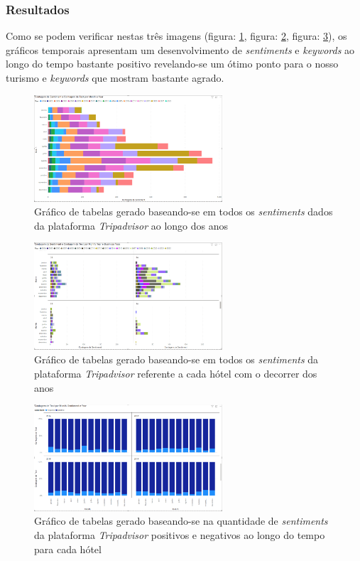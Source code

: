 \subsubsection{Resultados}

Como se podem verificar nestas três imagens (figura: \ref{fig:exemplofigqntsntmyear},  figura: \ref{fig:exemplofigqntyearbus}, figura: \ref{fig:exemplofigposneg}), os gráficos temporais apresentam um desenvolvimento de \textit{sentiments} e \textit{keywords} ao longo do tempo bastante positivo revelando-se um ótimo ponto para o nosso turismo e \textit{keywords} que mostram bastante agrado. 

\begin{figure}[!htb]
\centering
\includegraphics[width=7cm]{figuras/NrReviewsPerYear/TableGraph6.PNG}
\caption{Gráfico de tabelas gerado baseando-se em todos os \textit{sentiments} dados da plataforma \textit{Tripadvisor} ao longo dos anos}
\label{fig:exemplofigqntsntmyear}
\end{figure}

\begin{figure}[!htb]
\centering
\includegraphics[width=7cm]{figuras/NrReviewsPerYear&BusinessType/8.PNG}
\caption{Gráfico de tabelas gerado baseando-se em todos os \textit{sentiments} da plataforma \textit{Tripadvisor} referente a cada hótel com o decorrer dos anos}
\label{fig:exemplofigqntyearbus}
\end{figure}

\begin{figure}[!htb]
\centering
\includegraphics[width=7cm]{figuras/Pos&NegSentiments/TableGraph4.PNG}
\caption{Gráfico de tabelas gerado baseando-se na quantidade de \textit{sentiments} da plataforma \textit{Tripadvisor} positivos e negativos ao longo do tempo para cada hótel}
\label{fig:exemplofigposneg}
\end{figure}